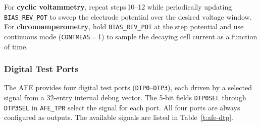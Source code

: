 For \textbf{cyclic voltammetry}, repeat steps\,10--12 while periodically updating \texttt{BIAS\_REV\_POT} to sweep the electrode potential over the desired voltage window. For \textbf{chronoamperometry}, hold \texttt{BIAS\_REV\_POT} at the step potential and use continuous mode (\texttt{CONTMEAS}\,=\,1) to sample the decaying cell current as a function of time.

\subsubsection*{Digital Test Ports}

The AFE provides four digital test ports (\texttt{DTP0}--\texttt{DTP3}), each driven by a selected signal from a 32-entry internal debug vector. The 5-bit fields \texttt{DTP0SEL} through \texttt{DTP3SEL} in \texttt{AFE\_TPR} select the signal for each port. All four ports are always configured as outputs. The available signals are listed in Table~\ref{t:afe-dtp}.

